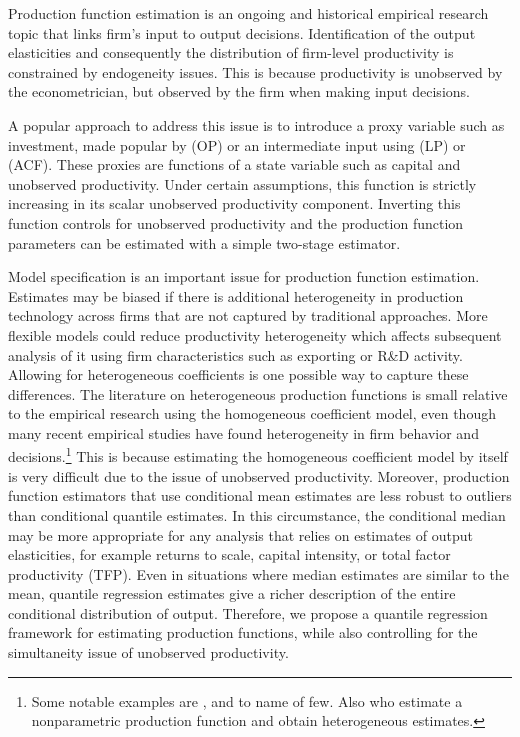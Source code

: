 \documentclass[12pt]{article}
\begin{document}
Production function estimation is an ongoing and historical empirical research topic that links firm's input to output decisions. Identification of the output elasticities and consequently the distribution of firm-level productivity is constrained by endogeneity issues. This is because productivity is unobserved by the econometrician, but observed by the firm when making input decisions. 

A popular approach to address this issue is to introduce a proxy variable such as investment, made popular by \cite{Olley1996} (OP) or an intermediate input using \cite{Levinsohn2003} (LP) or \cite{Ackerberg2015} (ACF). These proxies are functions of a state variable such as capital and unobserved productivity. Under certain assumptions, this function is strictly increasing in its scalar unobserved productivity component. Inverting this function controls for unobserved productivity and the production function parameters can be estimated with a simple two-stage estimator.

Model specification is an important issue for production function estimation. Estimates may be biased if there is additional heterogeneity in production technology across firms that are not captured by traditional approaches. More flexible models could reduce productivity heterogeneity which affects subsequent analysis of it using firm characteristics such as exporting or R\&D activity. Allowing for heterogeneous coefficients is one possible way to capture these differences. The literature on heterogeneous production functions is small relative to the empirical research using the homogeneous coefficient model, even though many recent empirical studies have found heterogeneity in firm behavior and decisions.\footnote{Some notable examples are \cite*{Kasahara2015}, \cite*{balat} and \cite*{Li2017} to name of few. Also \cite{Gandhi2020} who estimate a nonparametric production function and obtain heterogeneous estimates.} This is because estimating the homogeneous coefficient model by itself is very difficult due to the issue of unobserved productivity. Moreover, production function estimators that use conditional mean estimates are less robust to outliers than conditional quantile estimates. In this circumstance, the conditional median may be more appropriate for any analysis that relies on estimates of output elasticities, for example returns to scale, capital intensity, or total factor productivity (TFP). Even in situations where median estimates are similar to the mean, quantile regression estimates give a richer description of the entire conditional distribution of output. Therefore, we propose a quantile regression framework for estimating production functions, while also controlling for the simultaneity issue of unobserved productivity.  
\end{document}
